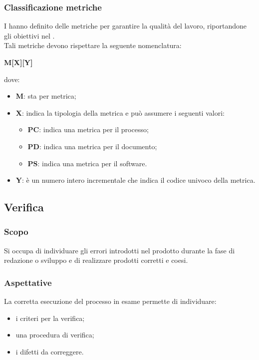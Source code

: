        \subsubsection{Classificazione metriche}
        I \roleVerifierP{} hanno definito delle metriche per garantire la qualità  del lavoro, riportandone gli obiettivi nel \docNameVersionPdQ{}. \\
        Tali metriche devono rispettare la seguente nomenclatura:
        \begin{center}\textbf{M[X][Y]}\end{center}
        dove:
        \begin{itemize}
            \item \textbf{M}: sta per metrica;
            \item \textbf{X}: indica la tipologia della metrica e può assumere i seguenti valori:
                \begin{itemize}
                    \item \textbf{PC}: indica una metrica per il processo;
                    \item \textbf{PD}: indica una metrica per il documento;
                    \item \textbf{PS}: indica una metrica per il software.
                \end{itemize}
            \item \textbf{Y}: è un numero intero incrementale che indica il codice univoco della metrica.
        \end{itemize}
    
    \subsection{Verifica}
        \subsubsection{Scopo}
        Si occupa di individuare gli errori introdotti nel prodotto durante la fase di redazione o sviluppo e di realizzare prodotti corretti e coesi.
        \subsubsection{Aspettative}
        La corretta esecuzione del processo in esame permette di individuare:
            \begin{itemize}
                \item i criteri per la verifica;
                \item una procedura di verifica;
                \item i difetti da correggere.
            \end{itemize}


